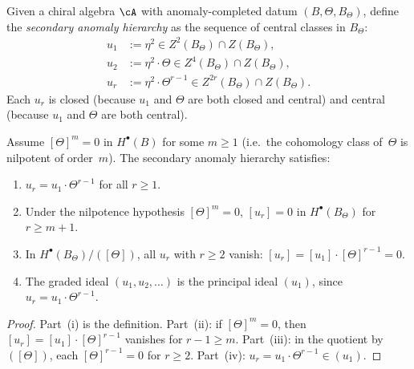 \begin{definition}
Given a chiral algebra $\cA$ with anomaly-completed datum
$(B, \Theta, B_\Theta)$, define the \emph{secondary anomaly
hierarchy} as the sequence of central classes in $B_\Theta$:
\begin{align*}
u_1 &:= \eta^2 \in Z^2(B_\Theta) \cap Z(B_\Theta), \\
u_2 &:= \eta^2 \cdot \Theta \in Z^4(B_\Theta) \cap Z(B_\Theta), \\
u_r &:= \eta^2 \cdot \Theta^{r-1}
\in Z^{2r}(B_\Theta) \cap Z(B_\Theta).
\end{align*}
Each $u_r$ is closed (because $u_1$ and $\Theta$ are both
closed and central) and central (because $u_1$ and $\Theta$
are both central).
\end{definition}

\begin{proposition}
Assume $[\Theta]^m = 0$ in $H^\bullet(B)$ for some $m \geq 1$
\textup{(}i.e.\ the cohomology class of~$\Theta$ is nilpotent
of order~$m$\textup{)}.
The secondary anomaly hierarchy satisfies:
\begin{enumerate}[label=\textup{(\roman*)}]
\item $u_r = u_1 \cdot \Theta^{r-1}$ for all $r \geq 1$.
\item Under the nilpotence hypothesis $[\Theta]^m = 0$,
 $[u_r] = 0$ in $H^\bullet(B_\Theta)$ for $r \geq m + 1$.
\item In $H^\bullet(B_\Theta)/([\Theta])$, all $u_r$ with
 $r \geq 2$ vanish: $[u_r] = [u_1] \cdot [\Theta]^{r-1} = 0$.
\item The graded ideal $(u_1, u_2, \dots)$ is the principal
 ideal $(u_1)$, since $u_r = u_1 \cdot \Theta^{r-1}$.
\end{enumerate}
\end{proposition}

\begin{proof}
Part~(i) is the definition.
Part~(ii): if $[\Theta]^m = 0$, then $[u_r] = [u_1] \cdot [\Theta]^{r-1}$
vanishes for $r - 1 \geq m$.
Part~(iii): in the quotient by $([\Theta])$, each
$[\Theta]^{r-1} = 0$ for $r \geq 2$.
Part~(iv): $u_r = u_1 \cdot \Theta^{r-1} \in (u_1)$.
\end{proof}

